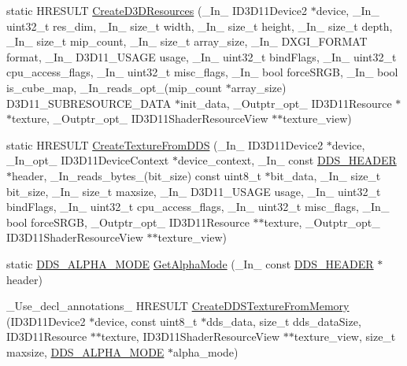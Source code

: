 \begin{DoxyCompactItemize}
static H\+R\+E\+S\+U\+LT \hyperlink{namespacemage_a45746b9c8018b682c999fe1c5d4158db}{Create\+D3\+D\+Resources} (\+\_\+\+In\+\_\+ I\+D3\+D11\+Device2 $\ast$device, \+\_\+\+In\+\_\+ uint32\+\_\+t res\+\_\+dim, \+\_\+\+In\+\_\+ size\+\_\+t width, \+\_\+\+In\+\_\+ size\+\_\+t height, \+\_\+\+In\+\_\+ size\+\_\+t depth, \+\_\+\+In\+\_\+ size\+\_\+t mip\+\_\+count, \+\_\+\+In\+\_\+ size\+\_\+t array\+\_\+size, \+\_\+\+In\+\_\+ D\+X\+G\+I\+\_\+\+F\+O\+R\+M\+AT format, \+\_\+\+In\+\_\+ D3\+D11\+\_\+\+U\+S\+A\+GE usage, \+\_\+\+In\+\_\+ uint32\+\_\+t bind\+Flags, \+\_\+\+In\+\_\+ uint32\+\_\+t cpu\+\_\+access\+\_\+flags, \+\_\+\+In\+\_\+ uint32\+\_\+t misc\+\_\+flags, \+\_\+\+In\+\_\+ bool force\+S\+R\+GB, \+\_\+\+In\+\_\+ bool is\+\_\+cube\+\_\+map, \+\_\+\+In\+\_\+reads\+\_\+opt\+\_\+(mip\+\_\+count $\ast$array\+\_\+size) D3\+D11\+\_\+\+S\+U\+B\+R\+E\+S\+O\+U\+R\+C\+E\+\_\+\+D\+A\+TA $\ast$init\+\_\+data, \+\_\+\+Outptr\+\_\+opt\+\_\+ I\+D3\+D11\+Resource $\ast$$\ast$texture, \+\_\+\+Outptr\+\_\+opt\+\_\+ I\+D3\+D11\+Shader\+Resource\+View $\ast$$\ast$texture\+\_\+view)
\item 
static H\+R\+E\+S\+U\+LT \hyperlink{namespacemage_a53fb464961d52002316f17c59ce58078}{Create\+Texture\+From\+D\+DS} (\+\_\+\+In\+\_\+ I\+D3\+D11\+Device2 $\ast$device, \+\_\+\+In\+\_\+opt\+\_\+ I\+D3\+D11\+Device\+Context $\ast$device\+\_\+context, \+\_\+\+In\+\_\+ const \hyperlink{structmage_1_1_d_d_s___h_e_a_d_e_r}{D\+D\+S\+\_\+\+H\+E\+A\+D\+ER} $\ast$header, \+\_\+\+In\+\_\+reads\+\_\+bytes\+\_\+(bit\+\_\+size) const uint8\+\_\+t $\ast$bit\+\_\+data, \+\_\+\+In\+\_\+ size\+\_\+t bit\+\_\+size, \+\_\+\+In\+\_\+ size\+\_\+t maxsize, \+\_\+\+In\+\_\+ D3\+D11\+\_\+\+U\+S\+A\+GE usage, \+\_\+\+In\+\_\+ uint32\+\_\+t bind\+Flags, \+\_\+\+In\+\_\+ uint32\+\_\+t cpu\+\_\+access\+\_\+flags, \+\_\+\+In\+\_\+ uint32\+\_\+t misc\+\_\+flags, \+\_\+\+In\+\_\+ bool force\+S\+R\+GB, \+\_\+\+Outptr\+\_\+opt\+\_\+ I\+D3\+D11\+Resource $\ast$$\ast$texture, \+\_\+\+Outptr\+\_\+opt\+\_\+ I\+D3\+D11\+Shader\+Resource\+View $\ast$$\ast$texture\+\_\+view)
\item 
static \hyperlink{namespacemage_a0c586a2bad862f4858900ca121ca80c2}{D\+D\+S\+\_\+\+A\+L\+P\+H\+A\+\_\+\+M\+O\+DE} \hyperlink{namespacemage_afcc0891e1660f8457696cb30f4ee518a}{Get\+Alpha\+Mode} (\+\_\+\+In\+\_\+ const \hyperlink{structmage_1_1_d_d_s___h_e_a_d_e_r}{D\+D\+S\+\_\+\+H\+E\+A\+D\+ER} $\ast$header)
\item 
\+\_\+\+Use\+\_\+decl\+\_\+annotations\+\_\+ H\+R\+E\+S\+U\+LT \hyperlink{namespacemage_a1570abdb85a5a68b2d78944b2446f98d}{Create\+D\+D\+S\+Texture\+From\+Memory} (I\+D3\+D11\+Device2 $\ast$device, const uint8\+\_\+t $\ast$dds\+\_\+data, size\+\_\+t dds\+\_\+data\+Size, I\+D3\+D11\+Resource $\ast$$\ast$texture, I\+D3\+D11\+Shader\+Resource\+View $\ast$$\ast$texture\+\_\+view, size\+\_\+t maxsize, \hyperlink{namespacemage_a0c586a2bad862f4858900ca121ca80c2}{D\+D\+S\+\_\+\+A\+L\+P\+H\+A\+\_\+\+M\+O\+DE} $\ast$alpha\+\_\+mode)

\end{DoxyCompactItemize}
